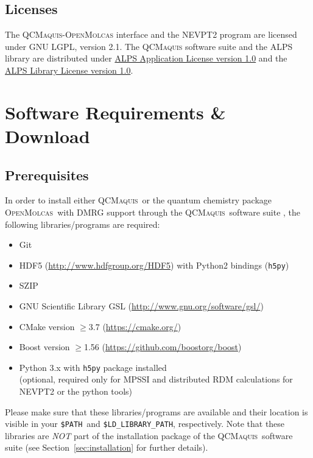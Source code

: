 \documentclass[bibliography=totoc,12pt,a4paper]{scrartcl}
\newcommand{\mol}{\textsc{OpenMolcas}}
\newcommand{\qcm}{\textsc{QCMaquis}}
\begin{document}
\subsection{Licenses}
\label{sec:license}

The \qcm{}-\mol{} interface and the NEVPT2 program are licensed under GNU LGPL, version 2.1.
The \qcm{} software suite and the ALPS library are distributed under \href{http://alps.comp-phys.org/static/software/applications/LICENSE.txt}{ALPS Application License version 1.0} and the \href{http://alps.comp-phys.org/static/software/ALPS/LICENSE.txt}{ALPS Library License version 1.0}.

\clearpage
\newpage
\section{Software Requirements \& Download}
\label{sec:install-req}

\subsection{Prerequisites}

In order to install either \qcm\ or the quantum chemistry package \mol\ with DMRG support through the \qcm\ software suite \cite{Keller_JChemPhys_efficient_2015,interface}, the following libraries/programs are required:

\begin{itemize}
 \item Git
 \item HDF5 (\url{http://www.hdfgroup.org/HDF5}) with Python2 bindings (\texttt{h5py})
 \item SZIP
 \item GNU Scientific Library GSL (\url{http://www.gnu.org/software/gsl/})
 \item CMake version $\geq$3.7 (\url{https://cmake.org/})
 \item Boost version $\geq$1.56 (\url{https://github.com/boostorg/boost})
 \item Python 3.x with \texttt{h5py} package installed\\
	   (optional, required only for MPSSI and distributed RDM calculations for NEVPT2 or the python tools)
\end{itemize}

\noindent Please make sure that these libraries/programs are available and their location is visible in your \texttt{\$PATH}\ and \texttt{\$LD\_LIBRARY\_PATH}, respectively.
Note that these libraries are \emph{NOT} part of the installation package of the \qcm\ software suite (see Section~\ref{sec:installation} for further details).
\end{document}
